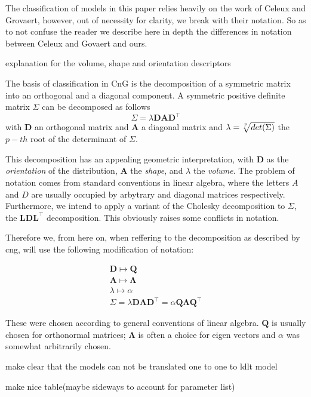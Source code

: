 The classification of models in this paper relies heavily on the work of Celeux and Grovaert, however, out of necessity for clarity, we break with their notation. So as to not confuse the reader we describe here in depth the differences in notation between Celeux and Govaert and ours.

explanation for the volume, shape and orientation descriptors

The basis of classification in CnG is the decomposition of a symmetric matrix into an orthogonal and a diagonal component. A symmetric positive definite matrix $ \Sigma $ can be decomposed as follows 
    \[ \Sigma = \lambda \pmb{D} \pmb{A} \pmb{D}^{\top} \]
with $ \pmb{D} $ an orthogonal matrix and $ \pmb{A} $ a diagonal matrix and $ \lambda = \sqrt[\uproot{3}p]{det(\Sigma)} $ the $ p-th $ root of the determinant of $ \Sigma $.

This decomposition has an appealing geometric interpretation, with $ \pmb{D} $ as the \textit{orientation} of the distribution, $ \pmb{A} $ the \textit{shape}, and $ \lambda $ the \textit{volume}. The problem of notation comes from standard conventions in linear algebra, where the letters $A$ and $D$ are usually occupied by arbytrary and diagonal matrices respectively. Furthermore, we intend to apply a variant of the Cholesky decomposition to $ \Sigma $, the $ \pmb{L}\pmb{D}\pmb{L}^{\top} $ decomposition. This obviously raises some conflicts in notation.

Therefore we, from here on, when reffering to the decomposition as described by cng, will use the following modification of notation:

\begin{align*} 
    \pmb{D} \longmapsto \pmb{Q} \\
    \pmb{A} \longmapsto \pmb{\Lambda} \\
    \lambda \longmapsto \alpha  \\
    \Sigma = \lambda \pmb{D} \pmb{A} \pmb{D}^{\top} =
        \alpha \pmb{Q} \pmb{\Lambda} \pmb{Q}^{\top}
\end{align*}

These were chosen according to general conventions of linear algebra. $ \pmb{Q} $ is usually chosen for orthonormal matrices; $ \pmb{\Lambda} $ is often a choice for eigen vectors and $ \alpha $ was somewhat arbitrarily chosen.


make clear that the models can not be translated one to one to ldlt model

make nice table(maybe sideways to account for parameter list)



